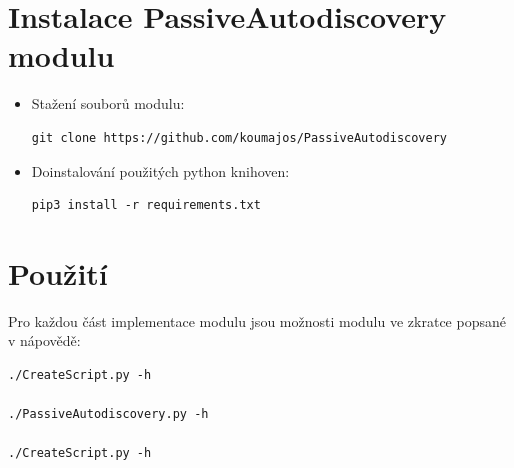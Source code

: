 \documentclass[thesis=B,czech,hidelinks]{FITthesis}[2019/03/21]
\begin{document}

\section{Instalace PassiveAutodiscovery modulu}
\begin{itemize}
    \item Stažení souborů modulu:
    \begin{lstlisting}[style=example]
    git clone https://github.com/koumajos/PassiveAutodiscovery
    \end{lstlisting}
    \item Doinstalování použitých python knihoven:
    \begin{lstlisting}[style=example]
    pip3 install -r requirements.txt
    \end{lstlisting}
\end{itemize}

\newpage
\section{Použití}
Pro každou část implementace modulu jsou možnosti modulu ve zkratce popsané v nápovědě:
\begin{lstlisting}[style=example]
./CreateScript.py -h

./PassiveAutodiscovery.py -h

./CreateScript.py -h
 \end{lstlisting}
 
\end{document}
